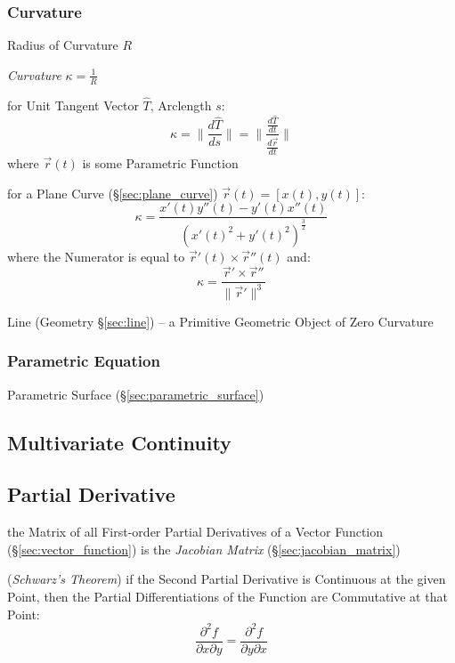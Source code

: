 \subsubsection{Curvature}\label{sec:curvature}

Radius of Curvature $R$

\emph{Curvature} $\kappa = \frac{1}{R}$

for Unit Tangent Vector $\hat{T}$, Arclength $s$:
\[
  \kappa = \|\frac{d\hat{T}}{ds}\|
    = \|\frac{\frac{d\hat{T}}{dt}}{\frac{d\vec{r}}{dt}}\|
\]
where $\vec{r}(t)$ is some Parametric Function

for a Plane Curve (\S\ref{sec:plane_curve}) $\vec{r}(t) = [x(t),y(t)]$:
\[
  \kappa = \frac{x'(t)y''(t) - y'(t)x''(t)} {(x'(t)^2 + y'(t)^2)^{\frac{3}{2}}}
\]
where the Numerator is equal to $\vec{r}'(t) \times \vec{r}''(t)$ and:
\[
  \kappa = \frac{\vec{r}' \times \vec{r}''}{\|\vec{r}'\|^3}
\]

\fist Line (Geometry \S\ref{sec:line}) -- a Primitive Geometric Object of Zero
Curvature



\subsubsection{Parametric Equation}\label{sec:parametric_equation}

\fist Parametric Surface (\S\ref{sec:parametric_surface})



\subsection{Multivariate Continuity}\label{sec:multivariate_continuity}

\subsection{Partial Derivative}\label{sec:partial_derivative}

the Matrix of all First-order Partial Derivatives of a Vector Function
(\S\ref{sec:vector_function}) is the \emph{Jacobian Matrix}
(\S\ref{sec:jacobian_matrix})

(\emph{Schwarz's Theorem}) if the Second Partial Derivative is Continuous at the
given Point, then the Partial Differentiations of the Function are Commutative
at that Point:
\[
  \frac{\partial^2f}{\partial{x}\partial{y}}
    = \frac{\partial^2f}{\partial{y}\partial{x}}
\]

